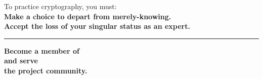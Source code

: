 \begin{frame}{}
  \raggedleft
  \begin{minipage}[fullwidth]{.50\pagewidth}
    \centering
    To practice cryptography, you must:
    \\[1.3em] \textbf{Make a choice to depart from merely-knowing.}
    \\[1.3em] \textbf{Accept the loss of your singular status as an expert.}
    \vspace{1em}
    \hrule
    \vspace{1.3em}
    \textbf{Become a member of}
    \\[1.1em] \textbf{and serve}
    \\[1.1em] \textbf{the project community.}
  \end{minipage}
\end{frame}
